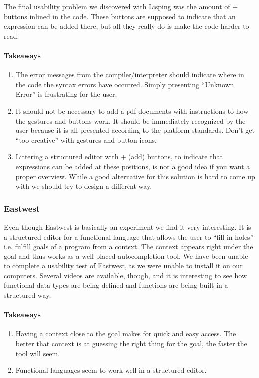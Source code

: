 The final usability problem we discovered with Lisping was the amount of + buttons inlined in the code. These buttons are supposed to indicate that an expression can be added there, but all they really do is make the code harder to read. 

\paragraph{Takeaways}
\begin{enumerate}
	\item The error messages from the compiler/interpreter should indicate where in the code the syntax errors have occurred. Simply presenting “Unknown Error” is frustrating for the user.
	\item It should not be necessary to add a pdf documents with instructions to how the gestures and buttons work. It should be immediately recognized by the user because it is all presented according to the platform standards. Don’t get “too creative” with gestures and button icons.
	\item Littering a structured editor with + (add) buttons, to indicate that expressions can be added at these positions, is not a good idea if you want a proper overview. While a good alternative for this solution is hard to come up with we should try to design a different way.
\end{enumerate}



\subsubsection{Eastwest}
Even though Eastwest is basically an experiment we find it very interesting. It is a structured editor for a functional language that allows the user to “fill in holes” i.e. fulfill goals of a program from a context. The context appears right under the goal and thus works as a well-placed autocompletion tool. We have been unable to complete a usability test of Eastwest, as we were unable to install it on our computers. Several videos are available, though, and it is interesting to see how functional data types are being defined and functions are being built in a structured way.

\paragraph{Takeaways}
\begin{enumerate}
	\item Having a context close to the goal makes for quick and easy access. The better that context is at guessing the right thing for the goal, the faster the tool will seem.
	\item Functional languages seem to work well in a structured editor.
\end{enumerate}


